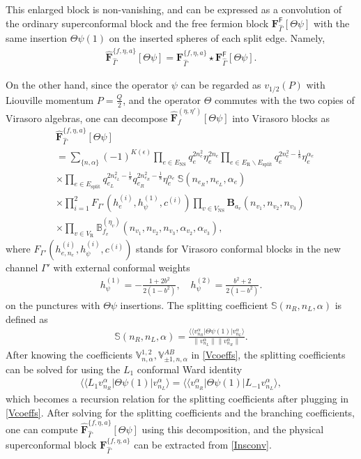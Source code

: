 \documentclass[aps,10pt,twocolumn,superscriptaddress]{revtex4-2}
\def\ie{\begin{equation}\begin{aligned}}
\def\fe{\end{aligned}\end{equation}}
\def\NS{\mathrm{NS}}
\def\R{\mathrm{R}}
\begin{document}
This enlarged block is non-vanishing, and can be expressed as a convolution of the ordinary superconformal block and the free fermion block $\mathbf{F}^{\mathsf{F}}_{\hat{\Gamma}}[\Theta \psi]$ with the same insertion $\Theta \psi(1)$ on the inserted spheres of each split edge. Namely,
\ie \label{Insconv}
\widehat{\mathbf{F}}^{\{f,\eta,a\}}_{\hat{\Gamma}}[\Theta \psi] = {\mathbf{F}}^{\{f,\eta,a\}}_{\hat{\Gamma}} \star \mathbf{F}^{\mathsf{F}}_{\hat{\Gamma}}[\Theta \psi].
\fe

On the other hand, since the operator $\psi$ can be regarded as $v_{1/2}(P)$ with Liouville momentum $P=\frac{Q}{2}$, and the operator $\Theta$ commutes with the two copies of Virasoro algebras, one can decompose $\widehat{\mathbf{F}}_f^{(\eta, \eta')}[\Theta \psi]$ into Virasoro blocks as
 \ie
&\widehat{\mathbf{F}}^{\{f,\eta,a\}}_{\hat{\Gamma}}[\Theta \psi]\\
 &= \sum_{\{n,\alpha\}} (-1)^{K(\epsilon)} \prod_{e\in E_\NS} q_e^{2n_e^2}\eta_e^{2n_e} \prod_{e\in E_\R\backslash E_\mathrm{split}} q_e^{2n_e^2-\frac{1}{8}}\eta_e^{\alpha_e}\\
&\times \prod_{e\in E_\mathrm{split}} q_{e_L}^{2n_{e_L}^2-\frac{1}{8}}q_{e_R}^{2n_{e_R}^2-\frac{1}{8}} \eta_e^{\alpha_e}\ \mathbb{S}(n_{e_R}, n_{e_L}, \alpha_e)\\
&\times \prod_{i=1}^2 F_{\Gamma'}(h_e^{(i)},h_\psi^{(1)}, c^{(i)}) \prod_{v\in V_\NS} \mathbf{B}_{a_v}(n_{v_1},n_{v_2},n_{v_3})\\
&\times \prod_{v\in V_\R} \mathbb{B}_{f_v}^{(\eta_v)}(n_{v_1},n_{v_2},n_{v_3},\alpha_{v_2},\alpha_{v_3}),
\fe   
where $F_{\Gamma'}(h_{e,n_e}^{(i)},h_\psi^{(i)}, c^{(i)})$ stands for Virasoro conformal blocks in the new channel $\Gamma'$ with external conformal weights
\ie 
h_\psi^{(1)}=-\frac{1+2 b^2}{2\left(1-b^2\right)}, \quad h_\psi^{(2)}=\frac{b^2+2}{2\left(1-b^2\right)}.
\fe
on the punctures with $\Theta \psi$ insertions. The splitting coefficient $\mathbb{S}(n_R,n_L,\alpha)$ is defined as
\ie
\mathbb{S}(n_R, n_L,\alpha) = \frac{\langle \langle v_{n_R}^\alpha|\Theta \psi(1)|v_{n_L}^{\alpha}\rangle}{\|v_{n_L}^{\alpha}\|\|v_{n_R}^{\alpha}\|}.
\fe
After knowing the coefficients $\mathbb{V}_{n,\alpha}^{1,2}, \mathbb{V}_{\pm 1,n,\alpha}^{AB}$ in \eqref{Vcoeffs}, the splitting coefficients can be solved for using the $L_1$ conformal Ward identity 
\ie
\langle\langle L_1 v_{n_R}^\alpha| \Theta \psi(1)|v_{n_L}^\alpha\rangle=\langle\langle v_{n_R}^\alpha| \Theta \psi(1)|L_{-1}v_{n_L}^\alpha\rangle,
\fe
which becomes a recursion relation for the splitting coefficients after plugging in \eqref{Vcoeffs}. After solving for the splitting coefficients and the branching coefficients, one can compute $\widehat{\mathbf{F}}^{\{f,\eta,a\}}_{\hat{\Gamma}}[\Theta \psi]$ using this decomposition, and the physical superconformal block $\mathbf{F}^{\{f,\eta,a\}}_{\hat{\Gamma}}$ can be extracted from \eqref{Insconv}. 
\end{document}
